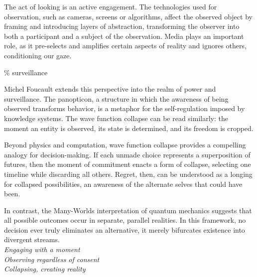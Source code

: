 The act of looking is an active engagement. The technologies used for observation, such as cameras, screens or algorithms, affect the observed object by framing and introducing layers of abstraction, transforming the observer into both a participant and a subject of the observation. Media plays an important role, as it pre-selects and amplifies certain aspects of reality and ignores others, conditioning our gaze.

{\scriptsize \textcolor{comment}{\%  surveillance }}

Michel Foucault extends this perspective into the realm of power and surveillance. The panopticon, a structure in which the awareness of being observed transforms behavior, is a metaphor for the self-regulation imposed by knowledge systems. \citep{foucault1975} The wave function collapse can be read similarly: the moment an entity is observed, its state is determined, and its freedom is cropped. 

Beyond physics and computation, wave function collapse provides a compelling analogy for decision-making. If each unmade choice represents a superposition of futures, then the moment of commitment enacts a form of collapse, selecting one timeline while discarding all others. Regret, then, can be understood as a longing for collapsed possibilities, an awareness of the alternate selves that could have been.

In contrast, the Many-Worlds interpretation of quantum mechanics suggests that all possible outcomes occur in separate, parallel realities. In this framework, no decision ever truly eliminates an alternative, it merely bifurcates existence into divergent streams.
\\
 
\textit{Engaging with a moment\\Observing regardless of consent\\Collapsing, creating reality}


